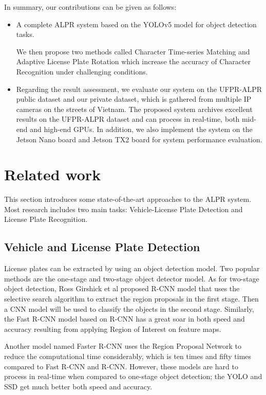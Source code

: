 \documentclass[conference]{IEEEtran}
\begin{document}
In summary, our contributions can be given as follows: 

\begin{itemize} 

\item A complete ALPR system based on the YOLOv5 model for object detection tasks. 

We then propose two methods called Character Time-series Matching and Adaptive License Plate Rotation which increase the accuracy of Character Recognition under challenging conditions. 

  

\item Regarding the result assessment, we evaluate our system on the UFPR-ALPR public dataset and our private dataset, which is gathered from multiple IP cameras on the streets of Vietnam. The proposed system archives excellent results on the UFPR-ALPR dataset and can process in real-time, both mid-end and high-end GPUs. In addition, we also implement the system on the Jetson Nano board and Jetson TX2 board for system performance evaluation. 
\end{itemize}

\section{Related work}
This section introduces some state-of-the-art approaches to the ALPR system. Most research includes two main tasks: Vehicle-License Plate Detection and License Plate Recognition.

\subsection{Vehicle and License Plate Detection}



License plates can be extracted by using an object detection model. Two popular methods are the one-stage and two-stage object detector model. As for two-stage object detection, Ross Girshick et al proposed R-CNN \cite{rcnn} model that uses the selective search algorithm to extract the region proposals in the first stage. Then a CNN model will be used to classify the objects in the second stage. Similarly, the Fast R-CNN model \cite{fastrcnn} based on R-CNN has a great soar in both speed and accuracy resulting from applying Region of Interest on feature maps. 

Another model named Faster R-CNN \cite{fasterrcnn} uses the Region Proposal Network to reduce the computational time considerably, which is ten times and fifty times compared to Fast R-CNN and R-CNN. However, these models are hard to process in real-time when compared to one-stage object detection; the YOLO \cite{YOLOv5} and SSD \cite{ssd} get much better both speed and accuracy. 
\end{document}
